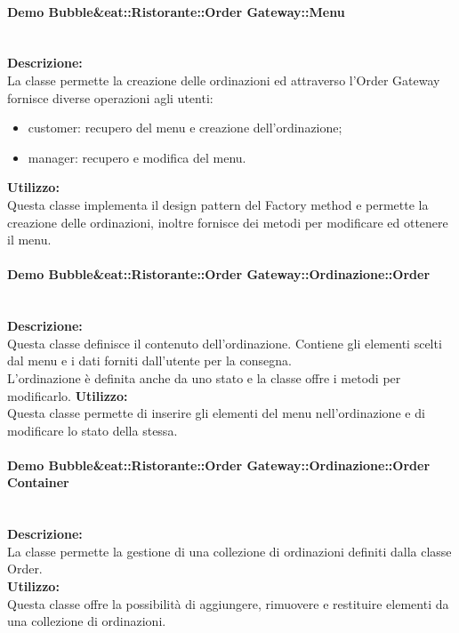 \paragraph{Demo Bubble\&eat::Ristorante::Order Gateway::Menu}\mbox{}\\
\textbf{Descrizione:}\\
La classe permette la creazione delle ordinazioni ed attraverso l’Order Gateway fornisce diverse operazioni agli utenti:
\begin{itemize}
	\item customer: recupero del menu e creazione dell’ordinazione;
	\item manager: recupero e modifica del menu.
\end{itemize}
\textbf{Utilizzo:}\\
Questa classe implementa il design pattern del Factory method e permette la creazione delle ordinazioni, inoltre fornisce dei metodi per modificare ed ottenere il menu.

\paragraph{Demo Bubble\&eat::Ristorante::Order Gateway::Ordinazione::Order}\mbox{}\\ 
\textbf{Descrizione:}\\
Questa classe definisce il contenuto dell’ordinazione. Contiene gli elementi scelti dal menu e i dati forniti dall’utente per la consegna.\\
L’ordinazione è definita anche da uno stato e la classe offre i metodi per modificarlo.
\textbf{Utilizzo:}\\
Questa classe permette di inserire gli elementi del menu nell'ordinazione e di modificare lo stato della stessa. 

\paragraph{Demo Bubble\&eat::Ristorante::Order Gateway::Ordinazione::Order Container}\mbox{}\\
\textbf{Descrizione:}\\
La classe permette la gestione di una collezione di ordinazioni definiti dalla classe Order.\\
\textbf{Utilizzo:}\\
Questa classe offre la possibilità di aggiungere, rimuovere e restituire elementi da una collezione di ordinazioni.